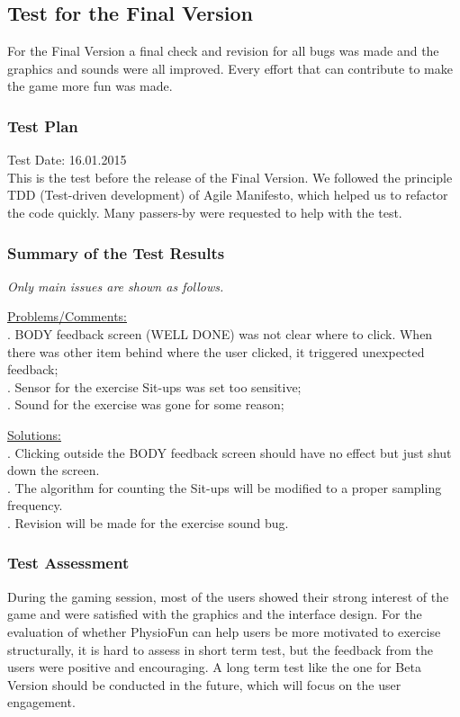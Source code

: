 \documentclass{article}
\begin{document}
\subsection{Test for the Final Version}
For the Final Version a final check and revision for all bugs was made and the graphics and sounds were all improved. Every effort that can contribute to make the game more fun was made.

\subsubsection{Test Plan}
Test Date: 16.01.2015\\
This is the test before the release of the Final Version. We followed the principle TDD (Test-driven development) of Agile Manifesto, which helped us to refactor the code quickly. Many passers-by were requested to help with the test.

\subsubsection{Summary of the Test Results}
\textit{Only main issues are shown as follows.}

\underline{Problems/Comments:} \\
. BODY feedback screen (WELL DONE) was not clear where to click. When there was other item behind where the user clicked, it triggered unexpected feedback;\\
. Sensor for the exercise Sit-ups was set too sensitive;\\
. Sound for the exercise was gone for some reason;

\underline{Solutions:} \\
. Clicking outside the BODY feedback screen should have no effect but just shut down the screen.\\
. The algorithm for counting the Sit-ups will be modified to a proper sampling frequency.\\
. Revision will be made for the exercise sound bug.

\subsubsection{Test Assessment}
During the gaming session, most of the users showed their strong interest of the game and were satisfied with the graphics and the interface design. For the evaluation of whether PhysioFun can help users be more motivated to exercise structurally, it is hard to assess in short term test, but the feedback from the users were positive and encouraging. A long term test like the one for Beta Version should be conducted in the future, which will focus on the user engagement.
\end{document}
